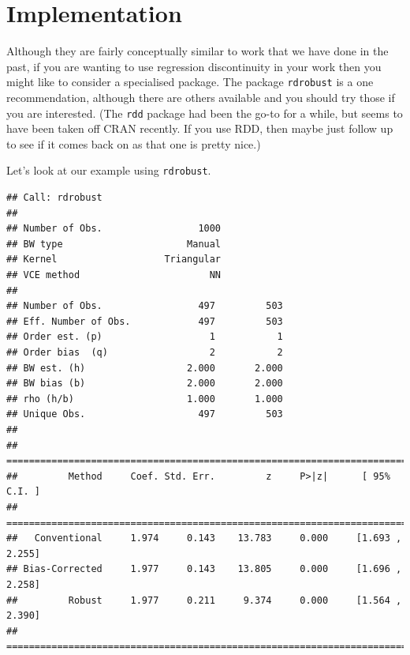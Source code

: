\documentclass[
]{book}
\newenvironment{Shaded}{\begin{snugshade}}{\end{snugshade}}
\newcommand{\DataTypeTok}[1]{\textcolor[rgb]{0.13,0.29,0.53}{#1}}
\newcommand{\DecValTok}[1]{\textcolor[rgb]{0.00,0.00,0.81}{#1}}
\newcommand{\KeywordTok}[1]{\textcolor[rgb]{0.13,0.29,0.53}{\textbf{#1}}}
\newcommand{\NormalTok}[1]{#1}
\newcommand{\OperatorTok}[1]{\textcolor[rgb]{0.81,0.36,0.00}{\textbf{#1}}}
\newcommand{\OtherTok}[1]{\textcolor[rgb]{0.56,0.35,0.01}{#1}}
\newcommand{\StringTok}[1]{\textcolor[rgb]{0.31,0.60,0.02}{#1}}
\begin{document}
\hypertarget{implementation-1}{%
\section{Implementation}\label{implementation-1}}

Although they are fairly conceptually similar to work that we have done in the past, if you are wanting to use regression discontinuity in your work then you might like to consider a specialised package. The package \texttt{rdrobust} is a one recommendation, although there are others available and you should try those if you are interested. (The \texttt{rdd} package had been the go-to for a while, but seems to have been taken off CRAN recently. If you use RDD, then maybe just follow up to see if it comes back on as that one is pretty nice.)

Let's look at our example using \texttt{rdrobust}.

\begin{Shaded}
\end{Shaded}

\begin{verbatim}
## Call: rdrobust
## 
## Number of Obs.                 1000
## BW type                      Manual
## Kernel                   Triangular
## VCE method                       NN
## 
## Number of Obs.                 497         503
## Eff. Number of Obs.            497         503
## Order est. (p)                   1           1
## Order bias  (q)                  2           2
## BW est. (h)                  2.000       2.000
## BW bias (b)                  2.000       2.000
## rho (h/b)                    1.000       1.000
## Unique Obs.                    497         503
## 
## =============================================================================
##         Method     Coef. Std. Err.         z     P>|z|      [ 95% C.I. ]       
## =============================================================================
##   Conventional     1.974     0.143    13.783     0.000     [1.693 , 2.255]     
## Bias-Corrected     1.977     0.143    13.805     0.000     [1.696 , 2.258]     
##         Robust     1.977     0.211     9.374     0.000     [1.564 , 2.390]     
## =============================================================================
\end{verbatim}
\end{document}
